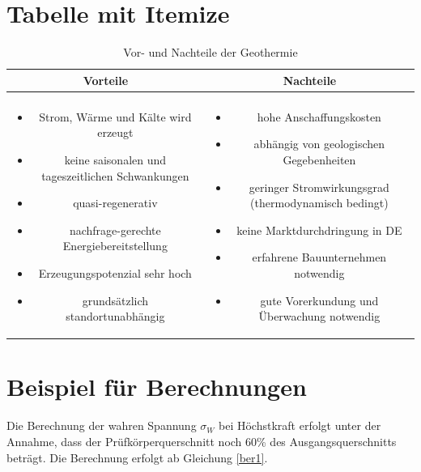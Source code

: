\section{Tabelle mit Itemize}
\vspace*{-2.5mm}
\renewcommand{\arraystretch}{1.2}
\begin{table}[h!]
	\centering
	\caption{Vor- und Nachteile der Geothermie}
	\label{tab:tabelle1}
	\begin{tabulary}{\textwidth}{C|C}
		\hline
		\textbf{Vorteile}  &\textbf{Nachteile} \\ 
		\hline
		&\\
		\begin{minipage}[t]{0.4\textwidth}
			\begin{itemize}
				\item Strom, Wärme und Kälte wird erzeugt
				\item keine saisonalen und tageszeitlichen Schwankungen
				\item 	quasi-regenerativ
				\item 	nachfrage-gerechte Energiebereitstellung
				\item Erzeugungspotenzial sehr hoch 
				\item 	grundsätzlich standortunabhängig
			\end{itemize}
		\end{minipage} & 
		\begin{minipage}[t]{0.4\textwidth}
			\begin{itemize}
				\item hohe Anschaffungskosten
				\item abhängig von geologischen Gegebenheiten
				\item geringer Stromwirkungsgrad (thermodynamisch bedingt)
				\item keine Marktdurchdringung in DE
				\item erfahrene Bauunternehmen notwendig
				\item gute Vorerkundung und Überwachung notwendig
			\end{itemize}
		\end{minipage}\\
	\end{tabulary}
\end{table}
\FloatBarrier
\vspace*{-2.5mm}

\section{Beispiel für Berechnungen}
Die Berechnung der wahren Spannung $\sigma_{W}$ bei Höchstkraft erfolgt unter der Annahme, dass der Prüfkörperquerschnitt noch 60\% des Ausgangsquerschnitts beträgt. Die Berechnung erfolgt ab Gleichung \ref{ber1}. 

